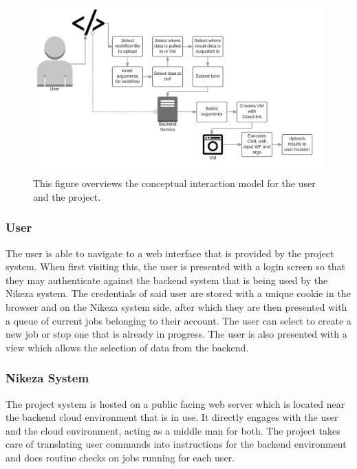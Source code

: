 \begin{figure}[ht!]
\centering
\includegraphics[width=\textwidth]{Figures/2_conceptual_model.png}
\decoRule
\caption[Nikeza System Concept]{This figure overviews the conceptual interaction model for the user and the project.}
\label{fig:sytem_concept}
\end{figure}

\subsubsection{User}

The user is able to navigate to a web interface that is provided by the project system. When first visiting this, the user is presented with a login screen so that they may authenticate against the backend system that is being used by the Nikeza system. The credentials of said user are stored with a unique cookie in the browser and on the Nikeza system side, after which they are then presented with a queue of current jobs belonging to their account. The user can select to create a new job or stop one that is already in progress. The user is also presented with a view which allows the selection of data from the backend.

\subsubsection{Nikeza System}

The project system is hosted on a public facing web server which is located near the backend cloud environment that is in use. It directly engages with the user and the cloud environment, acting as a middle man for both. The project takes care of translating user commands into instructions for the backend environment and does routine checks on jobs running for each user.

